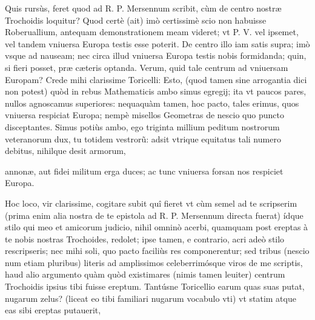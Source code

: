 \documentclass[11pt,a4paper]{article}
\begin{document}
Quis rursùs, feret quod ad R. P. Mersennum scribit, cùm de centro nostræ Trochoidis loquitur? Quod certè (ait) imò certissimè scio non habuisse Roberuallium, antequam demonstrationem meam videret; vt P. V. vel ipsemet, vel tandem vniuersa Europa testis esse poterit. De centro illo iam satis supra; imò vsque ad nauseam; nec circa illud vniuersa Europa testis nobis formidanda; quin, si fieri posset, præ cæteris optanda. Verum, quid tale centrum ad vniuersam Europam? Crede mihi clarissime Toricelli: Esto, (quod tamen sine arrogantia dici non potest) quòd in rebus Mathematicis ambo simus egregij; ita vt paucos pares, nullos agnoscamus superiores: nequaquàm tamen, hoc pacto, tales erimus, quos vniuersa respiciat Europa; nempè misellos Geometras de nescio quo puncto disceptantes. Simus potiùs ambo, ego triginta millium peditum nostrorum veteranorum dux, tu totidem vestrorũ: adsit vtrique equitatus tali numero debitus, nihilque desit armorum,


annonæ, aut fidei militum erga duces; ac tunc vniuersa forsan nos respiciet Europa.

Hoc loco, vir clarissime, cogitare subit quî fieret vt cùm semel ad te scripserim (prima enim alia nostra de te epistola ad R. P. Mersennum directa fuerat) ídque stilo qui meo et amicorum judicio, nihil omninò acerbi, quamquam post ereptas à te nobis nostras Trochoides, redolet; ipse tamen, e contrario, acri adeò stilo rescripseris; nec mihi soli, quo pacto faciliùs res componerentur; sed tribus (nescio num etiam pluribus) literis ad amplissimos celeberrimósque viros de me scriptis, haud alio argumento quàm quòd existimares (nimis tamen leuiter) centrum Trochoidis ipsius tibi fuisse ereptum. Tantúsne Toricellio earum quas suas putat, nugarum zelus? (liceat eo tibi familiari nugarum vocabulo vti) vt statim atque eas sibi ereptas putauerit,
\end{document}
